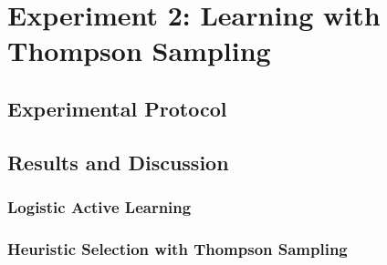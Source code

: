 

\chapter{Experiment 2: Learning with Thompson Sampling}
\label{cha:expt2}

\section{Experimental Protocol}
\label{sec:protocol2}



\section{Results and Discussion}
\label{sec:results2}

\subsection{Logistic Active Learning}


\subsection{Heuristic Selection with Thompson Sampling}

